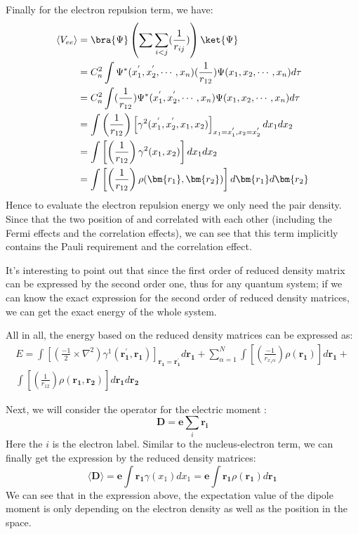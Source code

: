 Finally for the electron repulsion term, we have:
\begin{align}\label{DMeq:6}
  \langle V_{ee}\rangle &=
  \bra{\Psi}\left(\sum\sum_{i<j}(\frac{1}{r_{ij}})\right)\ket{\Psi}
  \nonumber \\
  &= C_{n}^{2}\int \Psi^{*}(x^{'}_{1}, x^{'}_{2}, \cdots,
  x_{n})(\frac{1}{r_{12}})\Psi(x_{1}, x_{2}, \cdots,
  x_{n})d\tau \nonumber \\
  &=C_{n}^{2}\int (\frac{1}{r_{12}})\Psi^{*}(x^{'}_{1}, x^{'}_{2}, \cdots,
  x_{n})\Psi(x_{1}, x_{2}, \cdots,
  x_{n})d\tau \nonumber \\
  &=\int \left(\frac{1}{r_{12}}\right)\left[
    \gamma^{2}(x^{'}_{1},x^{'}_{2}, x_{1},x_{2})\right]_{x_{1} =
    x_{1}^{'}, x_{2} = x_{2}^{'}} dx_{1}dx_{2}
  \nonumber \\
  &=\int \left[\left(\frac{1}{r_{12}}\right)
    \gamma^{2}(x_{1},x_{2})\right] dx_{1}dx_{2} \nonumber \\
  &= \int \left[\left(\frac{1}{r_{12}}\right)
    \rho(\bm{r_{1}},\bm{r_{2}})\right] d\bm{r_{1}}d\bm{r_{2}}
\end{align}
Hence to evaluate the electron repulsion energy we only need the pair
density. Since that the two position of  and 
correlated with each other (including the Fermi effects and the
correlation effects), we can see that this term implicitly contains
the Pauli requirement and the correlation effect.

It's interesting to point out that since the first order of reduced
density matrix can be expressed by the second order one, thus for any
quantum system; if we can know the exact expression for the second
order of reduced density matrices, we can get the exact energy of the
whole system.

All in all, the energy based on the reduced density matrices can be
expressed as:
\begin{multline}\label{DMeq:21}
  E = \int \left[\left(\frac{-1}{2}\times\nabla^2\right)
    \gamma^{1}(\bm{r^{'}_{1}}, \bm{r_{1}})\right]_{\bm{r_{1}} =
    \bm{r_{1}^{'}}} d\bm{r_{1}} + \sum_{\alpha=1}^{N}\int
  \left[\left(\frac{-1}{r_{x_{1}\alpha}}\right) \rho(\bm{r_{1}})\right]
  d\bm{r_{1}} + \\
  \int \left[\left(\frac{1}{r_{12}}\right)
    \rho(\bm{r_{1}}, \bm{r_{2}})\right]d\bm{r_{1}}d\bm{r_{2}}
\end{multline}


Next, we will consider the operator for the electric moment :
\begin{equation}\label{}
  \mathbf{D} = \mathbf{e}\sum_{i}\mathbf{r_{i}}
\end{equation}
Here the $i$ is the electron label. Similar to the nucleus-electron
term, we can finally get the expression by the reduced density
matrices:
\begin{equation}\label{}
  \langle\mathbf{D}\rangle = \mathbf{e}\int
  \mathbf{r_{1}}\gamma(x_{1})dx_{1} = \mathbf{e}\int
  \mathbf{r_{1}}\rho(\bm{r_{1}})d\bm{r_{1}}
\end{equation}
We can see that in the expression above, the expectation value of the
dipole moment is only depending on the electron density as well as the
position in the space.

